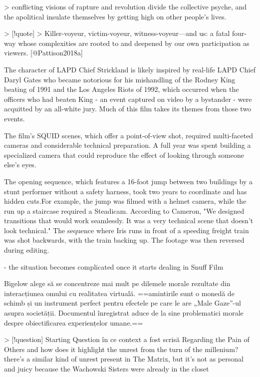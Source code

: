 \documentclass[12pt]{article}
\begin{document}
> conflicting visions of rapture and revolution divide the collective psyche, and the apolitical insulate themselves by getting high on other people’s lives.


> [!quote]
> Killer-voyeur, victim-voyeur, witness-voyeur—and us: a fatal four-way whose complexities are rooted to and deepened by our own participation as viewers. [@Pattison2018a]

The character of LAPD Chief Strickland is likely inspired by real-life LAPD Chief Daryl Gates who became notorious for his mishandling of the Rodney King beating of 1991 and the Los Angeles Riots of 1992, which occurred when the officers who had beaten King - an event captured on video by a bystander - were acquitted by an all-white jury. Much of this film takes its themes from those two events.

The film's SQUID scenes, which offer a point-of-view shot, required multi-faceted cameras and considerable technical preparation. A full year was spent building a specialized camera that could reproduce the effect of looking through someone else's eyes.

The opening sequence, which features a 16-foot jump between two buildings by a stunt performer without a safety harness, took two years to coordinate and has hidden cuts.For example, the jump was filmed with a helmet camera, while the run up a staircase required a Steadicam. According to Cameron, "We designed transitions that would work seamlessly. It was a very technical scene that doesn't look technical." The sequence where Iris runs in front of a speeding freight train was shot backwards, with the train backing up. The footage was then reversed during editing.

- the situation becomes complicated once it starts dealing in Snuff Film

Bigelow alege să se concentreze mai mult pe dilemele morale rezultate din interacțiunea omului cu realitatea virtuală. ==amintirile sunt o monedă de schimb și un instrument perfect pentru efectele pe care le are „Male Gaze”-ul asupra societății. Documentul înregistrat aduce de la sine problematici morale despre obiectificarea experiențelor umane.==

> [!question] Starting Question
în ce context a fost scrisă Regarding the Pain of Others and how does it highlight the unrest from the turn of the millenium? there's a similar kind of unrest present in The Matrix, but it's not as personal and juicy because the Wachowski Sisters were already in the closet
\end{document}
